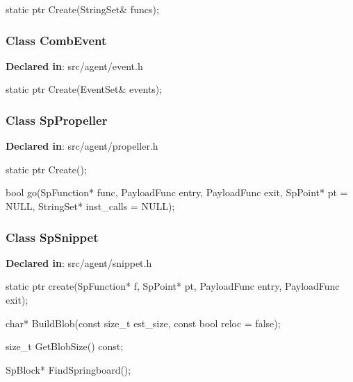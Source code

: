 \begin{apient}
static ptr Create(StringSet& funcs);
\end{apient}
\apidesc{
}

\subsubsection{Class CombEvent}
\textbf{Declared in}: src/agent/event.h

\begin{apient}
static ptr Create(EventSet& events);
\end{apient}
\apidesc{
}

\subsubsection{Class SpPropeller}
\textbf{Declared in}: src/agent/propeller.h

\begin{apient}
static ptr Create();
\end{apient}
\apidesc{
}

\begin{apient}
bool go(SpFunction* func,
        PayloadFunc entry,
        PayloadFunc exit,
        SpPoint* pt = NULL,
        StringSet* inst_calls = NULL);
\end{apient}
\apidesc{
}

\subsubsection{Class SpSnippet}
\textbf{Declared in}: src/agent/snippet.h

\begin{apient}
static ptr create(SpFunction* f,
                  SpPoint* pt,
                  PayloadFunc entry,
                  PayloadFunc exit);
\end{apient}
\apidesc{
}

\begin{apient}
char* BuildBlob(const size_t est_size,
                const bool reloc = false);
\end{apient}
\apidesc{
}

\begin{apient}
size_t GetBlobSize() const;
\end{apient}
\apidesc{
}

\begin{apient}
SpBlock* FindSpringboard();
\end{apient}
\apidesc{
}

